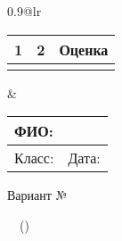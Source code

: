 \begin{tabular*}{0.9\textwidth}{@{\extracolsep{\fill}}lr}

\begin{tabular}{|c|c|c|}
\hline
1 & 2 & Оценка \\
\hline
  &   &        \\
\hline
\end{tabular}
 
&

\begin{tabular}{|l|l|}
\hline
\multicolumn{2}{|l|}{ФИО:} \\
\hline
Класс:  \hspace{1cm} &  Дата: \hspace{1.5cm} \\
\hline
\end{tabular}


\end{tabular*} 


\begin{center}
 \large 

Вариант № \varnum

\testtitle~~(\testdate)


\end{center}
